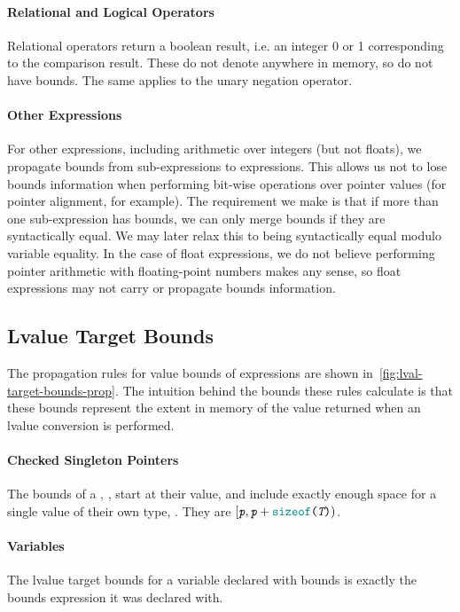 \paragraph{Relational and Logical Operators} Relational operators
return a boolean result, i.e. an integer 0 or 1 corresponding to the
comparison result. These do not denote anywhere in memory, so do not
have bounds. The same applies to the unary negation operator.

\paragraph{Other Expressions} For other expressions, including
arithmetic over integers (but not floats), we propagate bounds from
sub-expressions to expressions. This allows us not to lose bounds
information when performing bit-wise operations over pointer values
(for pointer alignment, for example). The requirement we make is that
if more than one sub-expression has bounds, we can only merge bounds
if they are syntactically equal. We may later relax this to being
syntactically equal modulo variable equality. In the case of float
expressions, we do not believe performing pointer arithmetic with
floating-point numbers makes any sense, so float expressions may not
carry or propagate bounds information.

\subsection{Lvalue Target Bounds}
\label{sec:lvalue-target-prop-rules}

The propagation rules for value bounds of expressions are shown
in~\autoref{fig:lval-target-bounds-prop}. The intuition behind the
bounds these rules calculate is that these bounds represent the extent
in memory of the value returned when an lvalue conversion is
performed.

\paragraph{Checked Singleton Pointers} The bounds of a \PtrT, ,
start at their value, and include exactly enough space for a single
value of their own type, . They are
$\left[\mv{p}, \mv{p} + \sizeof{\mv{T}} \right)$.

\paragraph{Variables} The lvalue target bounds for a variable declared
with bounds is exactly the bounds expression it was declared with.

